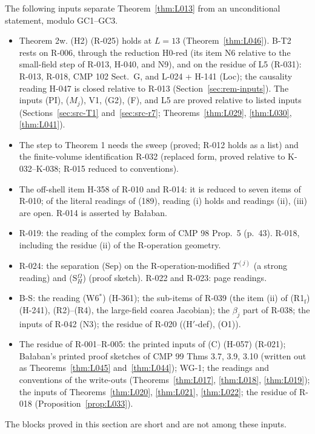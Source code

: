 The following inputs separate Theorem~\ref{thm:L013} from an unconditional statement, modulo GC1--GC3.
\begin{itemize}
\item[(a)] Theorem 2w. (H2) (R-025) holds at $L=13$ (Theorem~\ref{thm:L046}). B-T2 rests on R-006, through the reduction H0-red (its item N6 relative to the small-field step of R-013, H-040, and N9), and on the residue of L5 (R-031): R-013, R-018, CMP 102 Sect.~G, and L-024 + H-141 (Loc); the causality reading H-047 is closed relative to R-013 (Section~\ref{sec:rem-inputs}). The inputs (PI), ($M_j$), V1, (G2), (F), and L5 are proved relative to listed inputs (Sections~\ref{sec:src-T1} and~\ref{sec:src-r7}; Theorems~\ref{thm:L029}, \ref{thm:L030}, \ref{thm:L041}).
\item[(b)] The step to Theorem 1 needs the sweep (proved; R-012 holds as a list) and the finite-volume identification R-032 (replaced form, proved relative to K-032--K-038; R-015 reduced to conventions).
\item[(c)] The off-shell item H-358 of R-010 and R-014: it is reduced to seven items of R-010; of the literal readings of (189), reading (i) holds and readings (ii), (iii) are open. R-014 is asserted by Ba{\l}aban.
\item[(d)] R-019: the reading of the complex form of CMP 98 Prop.~5 (p.~43). R-018, including the residue (ii) of the R-operation geometry.
\item[(e)] R-024: the separation (Sep) on the R-operation-modified $T^{(j)}$ (a strong reading) and (S$_H^\Omega$) (proof sketch). R-022 and R-023: page readings.
\item[(f)] B-S: the reading (W6$^*$) (H-361); the sub-items of R-039 (the item (ii) of (R1$_{\mathrm f}$) (H-241), (R2)--(R4), the large-field coarea Jacobian); the $\beta_j$ part of R-038; the inputs of R-042 (N3); the residue of R-020 ((H$'$-def), (O1)).
\item[(g)] The residue of R-001--R-005: the printed inputs of (C) (H-057) (R-021); Ba{\l}aban's printed proof sketches of CMP 99 Thms 3.7, 3.9, 3.10 (written out as Theorems~\ref{thm:L045} and~\ref{thm:L044}); WG-1; the readings and conventions of the write-outs (Theorems~\ref{thm:L017}, \ref{thm:L018}, \ref{thm:L019}); the inputs of Theorems~\ref{thm:L020}, \ref{thm:L021}, \ref{thm:L022}; the residue of R-018 (Proposition~\ref{prop:L033}).
\end{itemize}
The blocks proved in this section are short and are not among these inputs.

